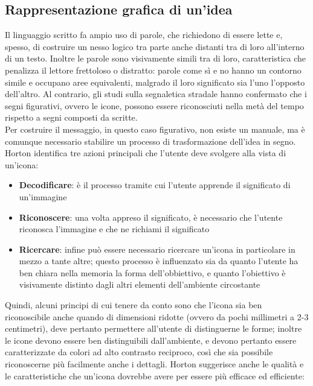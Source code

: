 \documentclass[11pt,a4paper]{article}
\begin{document}
\subsection{Rappresentazione grafica di un'idea}
Il linguaggio scritto fa
ampio uso di parole, che richiedono di essere lette e, spesso, di costruire un nesso logico tra parte anche distanti tra di loro all'interno di un testo. Inoltre le parole sono visivamente simili tra di loro, caratteristica che penalizza il lettore frettoloso o distratto: parole come sì e no hanno un contorno simile e occupano aree equivalenti, malgrado il loro significato sia l'uno l'opposto dell'altro.
Al contrario, gli studi sulla segnaletica stradale hanno confermato che i segni figurativi, ovvero le icone, possono essere riconosciuti nella metà del tempo rispetto a segni composti da scritte. \\
Per costruire il messaggio, in questo caso figurativo, non esiste un manuale, ma è comunque necessario stabilire un processo di trasformazione dell'idea in segno.\\
Horton identifica tre azioni principali che l'utente deve svolgere alla vista di un'icona:
\begin{itemize}
	\item \textbf{Decodificare}:  è il processo tramite cui l'utente apprende il significato di un'immagine
	\item \textbf{Riconoscere}: una volta appreso il significato, è necessario che l'utente riconosca l'immagine e che ne richiami il significato
	\item \textbf{Ricercare}: infine può essere necessario ricercare un'icona in particolare in mezzo a tante altre; questo processo è influenzato sia da quanto l'utente ha ben chiara nella memoria la forma dell'obbiettivo, e quanto l'obiettivo è visivamente distinto dagli altri elementi dell'ambiente circostante
\end{itemize}
Quindi, alcuni principi di cui tenere da conto sono che l'icona sia ben riconoscibile anche quando di dimensioni ridotte (ovvero da pochi millimetri a 2-3 centimetri), deve pertanto permettere all'utente di distinguerne le forme; inoltre le icone devono essere ben distinguibili dall'ambiente, e devono pertanto essere caratterizzate da colori ad alto contrasto reciproco, così che sia possibile riconoscerne più facilmente anche i dettagli. 
Horton suggerisce anche le qualità e le caratteristiche che un'icona dovrebbe avere per essere più efficace ed efficiente:
\end{document}
